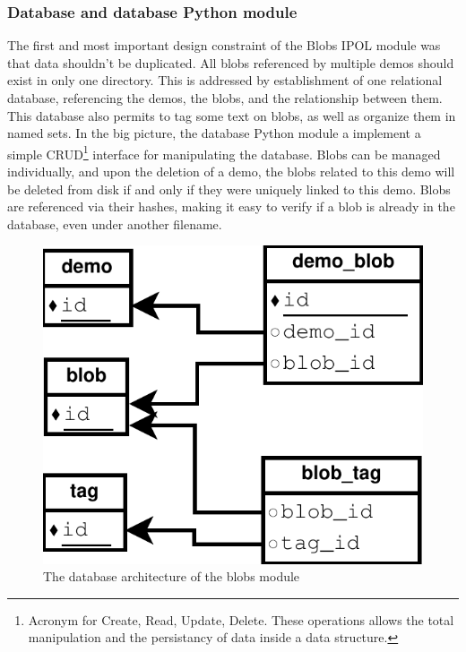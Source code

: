 \subsubsection{Database and database Python module}
The first and most important design constraint of the Blobs IPOL module was that data shouldn't be duplicated. All blobs referenced by multiple demos should exist in only one directory. This is addressed by establishment of one relational database, referencing the demos, the blobs, and the relationship between them. This database also permits to tag some text on blobs, as well as organize them in named sets. In the big picture, the database Python module a implement a simple CRUD\footnote{Acronym for Create, Read, Update, Delete. These operations allows the total manipulation and the persistancy of data inside a data structure.} interface for manipulating the database. Blobs can be managed individually, and upon the deletion of a demo, the blobs related to this demo will be deleted from disk if and only if they were uniquely linked to this demo. Blobs are referenced via their hashes, making it easy to verify if a blob is already in the database, even under another filename. \\

\begin{figure}[h]
\centering
\includegraphics[scale=0.75]{blobs/images/blobs_database.pdf}
\caption{The database architecture of the blobs module} 
\label{fig:blobs_database}
\end{figure}


